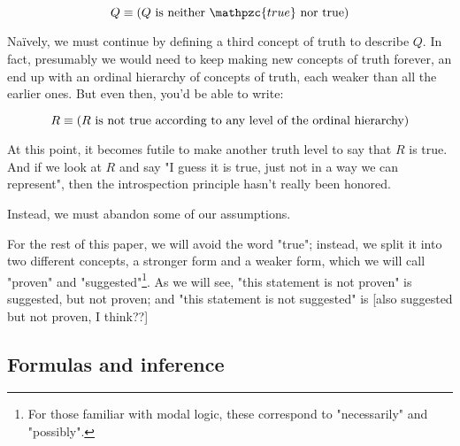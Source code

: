 \documentclass{article}
\begin{document}
  \begin{equation*}
    Q \equiv (Q \mathrm{\ is\ neither\ }\mathpzc{true}\mathrm{\ nor\ true})\\
  \end{equation*}
  
  Naïvely, we must continue by defining a third concept of truth to describe $Q$.
  In fact, presumably we would need to keep making new concepts of truth forever, an end up with an ordinal hierarchy of concepts of truth, each weaker than all the earlier ones. But even then, you'd be able to write:
  
  \begin{equation*}
    R \equiv (R \text{ is not true according to any level of the ordinal hierarchy})\\
  \end{equation*}
  
  At this point, it becomes futile to make another truth level to say that $R$ is true.
  And if we look at $R$ and say "I guess it is true, just not in a way we can represent", then the introspection principle hasn't really been honored.
  
  Instead, we must abandon some of our assumptions.
  
  For the rest of this paper, we will avoid the word "true"; instead, we split it into two different concepts, a stronger form and a weaker form, which we will call "proven" and "suggested"\footnote{For those familiar with modal logic, these correspond to "necessarily" and "possibly".}. As we will see, "this statement is not proven" is suggested, but not proven; and "this statement is not suggested" is [also suggested but not proven, I think??]
  
  \subsection{Formulas and inference}
  
  \newcommand{\name}[1]{\operatorname{\texttt{#1}}}
  \newcommand{\id}{\name{id}}
  \newcommand{\const}{\name{const}}
  \newcommand{\fuse}{\name{fuse}}
  \newcommand{\atomemptyset}{\name{empty\_set}}
  \newcommand{\atomunion}{\name{union}}
  \newcommand{\atomconcludes}{\name{concludes}}
  \newcommand{\atomall}{\name{all}}
  \newcommand{\atominfrule}{\name{rule}}
  \renewcommand{\emptyset}{\varnothing}
  \newcommand{\union}{\cup}
  \newcommand{\all}{\bigcup}
  \newcommand{\atomequals}{\name{equals}}
  \newcommand{\equals}{\equiv}
  \newcommand{\concludes}{\leadsto}
  \newcommand{\infrule}{\vdash}
  
\end{document}
